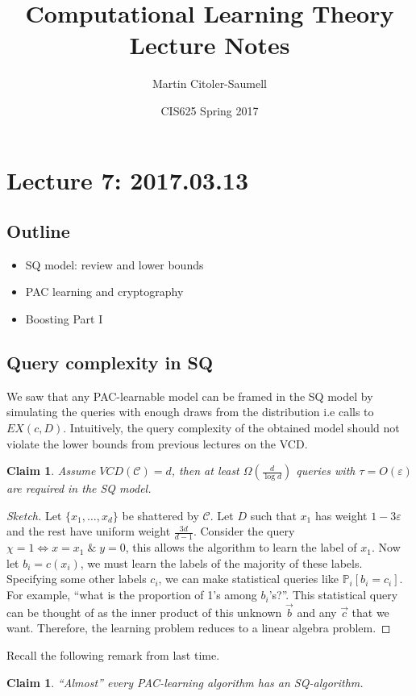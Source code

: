 \documentclass[12pt, letterpaper]{article}
\title{Computational Learning Theory Lecture Notes}
\author{Martin Citoler-Saumell}
\date{CIS625 Spring 2017}
\numberwithin{equation}{section} %
\newcommand{\mb}{\mathbb}
\newcommand{\mc}{\mathcal}
\newcommand{\ve}{\varepsilon}
\newtheorem{claim}[theorem]{Claim}
\theoremstyle{definition}
\theoremstyle{remark}
\begin{document}
\section{Lecture 7: 2017.03.13}
\subsection*{Outline}
\begin{itemize}
\item SQ model: review  and lower bounds
\item PAC learning and cryptography
\item Boosting Part I
\end{itemize}

\subsection{Query complexity in SQ}
We saw that any PAC-learnable model can be framed in the SQ model by simulating the queries with enough draws from the distribution i.e calls to $EX(c, D)$. Intuitively,  the query complexity of the obtained model should not violate the lower bounds from previous lectures on the VCD.

\begin{claim}
Assume $VCD(\mc C)=d$, then at least $\Omega\left(\frac d{\log d}\right)$ queries with $\tau = O(\ve)$ are required in the SQ model.
\end{claim}
\begin{proof}[Sketch]
Let $\lbrace x_1,\ldots,x_d\rbrace$ be shattered by $\mc C$. Let $D$ such that $x_1$ has weight $1-3\ve$ and the rest have uniform weight $\frac{3d}{d-1}$. Consider the query $\chi = 1 \iff x=x_1\;\&\; y=0$, this allows the algorithm to learn the label of $x_1$. Now let $b_i = c(x_i)$, we must learn the labels of the majority of these labels. Specifying some other labels $c_i$, we can make statistical queries like $\mb P_i[b_i=c_i]$. For example, ``what is the proportion of 1's among $b_i$'s?''. This statistical query can be thought of as the inner product of this unknown $\vec b$ and any $\vec c$ that we want. Therefore, the learning problem reduces to a linear algebra problem.
\end{proof}

Recall the following remark from last time.
\begin{claim}
``Almost'' every PAC-learning algorithm has an SQ-algorithm.
\end{claim}
\end{document}
